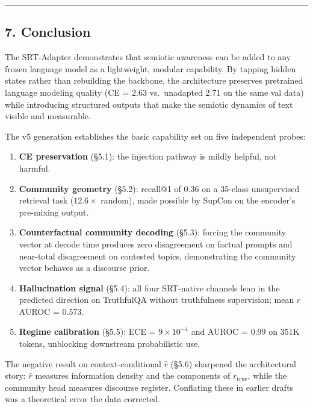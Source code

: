 \documentclass[
  11pt]{article}
\providecommand{\tightlist}{%
  \setlength{\itemsep}{0pt}\setlength{\parskip}{0pt}}
\begin{document}
\begin{center}\rule{0.5\linewidth}{0.5pt}\end{center}

\subsection{7. Conclusion}\label{conclusion}

The SRT-Adapter demonstrates that semiotic awareness can be added to any
frozen language model as a lightweight, modular capability. By tapping
hidden states rather than rebuilding the backbone, the architecture
preserves pretrained language modeling quality (CE = 2.63 vs.~unadapted
2.71 on the same val data) while introducing structured outputs that
make the semiotic dynamics of text visible and measurable.

The v5 generation establishes the basic capability set on five
independent probes:

\begin{enumerate}
\def\labelenumi{\arabic{enumi}.}
\tightlist
\item
  \textbf{CE preservation} (§5.1): the injection pathway is mildly
  helpful, not harmful.
\item
  \textbf{Community geometry} (§5.2): recall@1 of 0.36 on a 35-class
  unsupervised retrieval task (\(12.6\times\) random), made possible by
  SupCon on the encoder's pre-mixing output.
\item
  \textbf{Counterfactual community decoding} (§5.3): forcing the
  community vector at decode time produces zero disagreement on factual
  prompts and near-total disagreement on contested topics, demonstrating
  the community vector behaves as a discourse prior.
\item
  \textbf{Hallucination signal} (§5.4): all four SRT-native channels
  lean in the predicted direction on TruthfulQA without truthfulness
  supervision; mean \(\hat{r}\) AUROC = 0.573.
\item
  \textbf{Regime calibration} (§5.5): ECE = \(9 \times 10^{-4}\) and
  AUROC = 0.99 on 351K tokens, unblocking downstream probabilistic use.
\end{enumerate}

The negative result on context-conditional \(\hat{r}\) (§5.6) sharpened
the architectural story: \(\hat{r}\) measures information density and
the components of \(r_{\text{true}}\), while the community head measures
discourse register. Conflating these in earlier drafts was a theoretical
error the data corrected.
\end{document}
